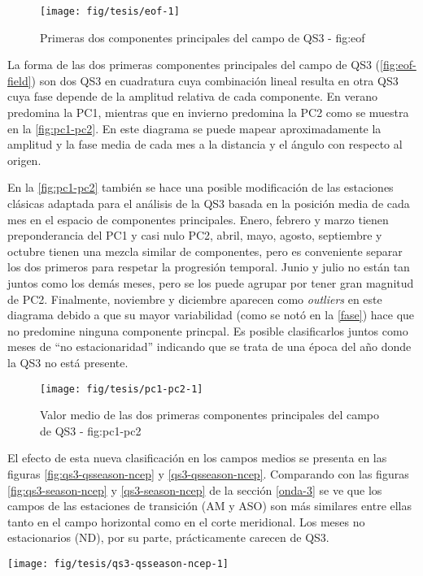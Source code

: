 \documentclass[spanish,a4paper]{book}
\begin{document}
\begin{figure}
\texttt{[image: fig/tesis/eof-1]} \caption{Primeras dos componentes principales del campo de QS3 - fig:eof}\label{fig:eof}
\end{figure}

La forma de las dos primeras componentes principales del campo de QS3
(\autoref{fig:eof-field}) son dos QS3 en cuadratura cuya combinación
lineal resulta en otra QS3 cuya fase depende de la amplitud relativa de
cada componente. En verano predomina la PC1, mientras que en invierno
predomina la PC2 como se muestra en la \autoref{fig:pc1-pc2}. En este
diagrama se puede mapear aproximadamente la amplitud y la fase media de
cada mes a la distancia y el ángulo con respecto al origen.

En la \autoref{fig:pc1-pc2} también se hace una posible modificación de
las estaciones clásicas adaptada para el análisis de la QS3 basada en la
posición media de cada mes en el espacio de componentes principales.
Enero, febrero y marzo tienen preponderancia del PC1 y casi nulo PC2,
abril, mayo, agosto, septiembre y octubre tienen una mezcla similar de
componentes, pero es conveniente separar los dos primeros para respetar
la progresión temporal. Junio y julio no están tan juntos como los demás
meses, pero se los puede agrupar por tener gran magnitud de PC2.
Finalmente, noviembre y diciembre aparecen como \emph{outliers} en este
diagrama debido a que su mayor variabilidad (como se notó en la
\autoref{fase}) hace que no predomine ninguna componente princpal. Es
posible clasificarlos juntos como meses de ``no estacionaridad''
indicando que se trata de una época del año donde la QS3 no está
presente.

\begin{figure}
\texttt{[image: fig/tesis/pc1-pc2-1]} \caption{Valor medio de las dos primeras componentes principales del campo de QS3 - fig:pc1-pc2}\label{fig:pc1-pc2}
\end{figure}

El efecto de esta nueva clasificación en los campos medios se presenta
en las figuras \ref{fig:qs3-qsseason-ncep} y \ref{qs3-qsseason-ncep}.
Comparando con las figuras \ref{fig:qs3-season-ncep} y
\ref{qs3-season-ncep} de la sección \ref{onda-3} se ve que los campos de
las estaciones de transición (AM y ASO) son más similares entre ellas
tanto en el campo horizontal como en el corte meridional. Los meses no
estacionarios (ND), por su parte, prácticamente carecen de QS3.

\begin{figure*}
\texttt{[image: fig/tesis/qs3-qsseason-ncep-1]} \caption{Media de reconstrucción de onda 3 en 300hPa - fig:qs3-qsseason-ncep}\label{fig:qs3-qsseason-ncep}
\end{figure*}
\end{document}
